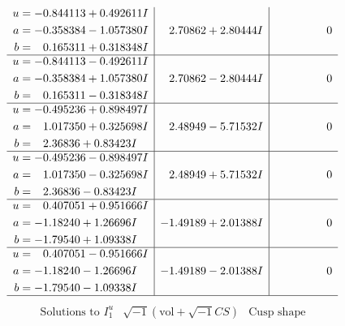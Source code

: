 \documentclass[1p]{elsarticle_modified}
\theoremstyle{definition}
\newcommand{\I}{\sqrt{-1}}
\begin{document}
$$\begin{array}{c|c|c}
\begin{aligned}
u &= -0.844113 + 0.492611 I \\
a &= -0.358384 - 1.057380 I \\
b &= \phantom{-}0.165311 + 0.318348 I\end{aligned}
 & \phantom{-}2.70862 + 2.80444 I & \phantom{-0.000000 } 0 \\ \hline\begin{aligned}
u &= -0.844113 - 0.492611 I \\
a &= -0.358384 + 1.057380 I \\
b &= \phantom{-}0.165311 - 0.318348 I\end{aligned}
 & \phantom{-}2.70862 - 2.80444 I & \phantom{-0.000000 } 0 \\ \hline\begin{aligned}
u &= -0.495236 + 0.898497 I \\
a &= \phantom{-}1.017350 + 0.325698 I \\
b &= \phantom{-}2.36836 + 0.83423 I\end{aligned}
 & \phantom{-}2.48949 - 5.71532 I & \phantom{-0.000000 } 0 \\ \hline\begin{aligned}
u &= -0.495236 - 0.898497 I \\
a &= \phantom{-}1.017350 - 0.325698 I \\
b &= \phantom{-}2.36836 - 0.83423 I\end{aligned}
 & \phantom{-}2.48949 + 5.71532 I & \phantom{-0.000000 } 0 \\ \hline\begin{aligned}
u &= \phantom{-}0.407051 + 0.951666 I \\
a &= -1.18240 + 1.26696 I \\
b &= -1.79540 + 1.09338 I\end{aligned}
 & -1.49189 + 2.01388 I & \phantom{-0.000000 } 0 \\ \hline\begin{aligned}
u &= \phantom{-}0.407051 - 0.951666 I \\
a &= -1.18240 - 1.26696 I \\
b &= -1.79540 - 1.09338 I\end{aligned}
 & -1.49189 - 2.01388 I & \phantom{-0.000000 } 0\\
 \hline 
 \end{array}$$\newpage$$\begin{array}{c|c|c}  
\text{Solutions to }I^u_{1}& \I (\text{vol} + \sqrt{-1}CS) & \text{Cusp shape}\\
 \hline 
\begin{aligned}

\end{aligned}
\end{array}$$
\end{document}

